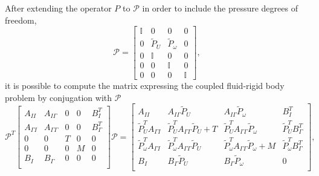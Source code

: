 \documentclass[graybox]{svmult}
\newcommand{\tvel}{U} %
\newcommand{\angvel}{\omega} %
\begin{document}
After extending the operator $P$ to $\mathcal{P}$ in order to include the pressure degrees of freedom,
\begin{equation*}
	\mathcal{P} =
	\begin{bmatrix}
		\mathbb{I} &  0 & 0 & 0\\
		0 &\tilde{P}_\tvel & \tilde{P}_\angvel & 0\\
		0 &\mathbb{I} & 0 & 0\\
		0 &0 & \mathbb{I} & 0\\
		0 &0& 0& \mathbb{I}
	\end{bmatrix},
\end{equation*}
it is possible to compute the matrix expressing the coupled fluid-rigid body problem by conjugation with $\mathcal{P}$ 
\begin{equation*}
	\mathcal{P}^T \begin{bmatrix}
		A_{II} & A_{I\Gamma} & 0 & 0 & B_{I}^T  \\
		A_{\Gamma I} & A_{\Gamma \Gamma}  & 0 & 0 & B_{\Gamma}^T\\
		0 & 0 & T & 0 & 0 \\
		0 & 0 & 0& M 
		& 0\\
		B_I & B_\Gamma & 0 & 0 & 0   \\
	\end{bmatrix} \mathcal{P} = 
	\begin{bmatrix}
		A_{II}& A_{I\Gamma}\tilde{P}_\tvel   & A_{I\Gamma} \tilde{P}_\angvel   & B_{I}^T  \\
		\tilde{P}_\tvel^T A_{\Gamma I}  & \tilde{P}_\tvel ^T A_{\Gamma \Gamma} \tilde{P}_\tvel + T & \tilde{P}_\tvel ^T A_{\Gamma \Gamma} \tilde{P}_\angvel & \tilde{P}_\tvel^TB_{\Gamma}^T\\
		\tilde{P}_\angvel^T A_{\Gamma I}  & \tilde{P}_\angvel ^T A_{\Gamma \Gamma} \tilde{P}_\tvel & \tilde{P}_\angvel ^T A_{\Gamma \Gamma} \tilde{P}_\angvel + M& \tilde{P}_\angvel^TB_{\Gamma}^T\\
		B_I   & B_\Gamma\tilde{P}_\tvel  &  B_\Gamma\tilde{P}_\angvel & 0   \\
	\end{bmatrix},
\end{equation*}
\end{document}
